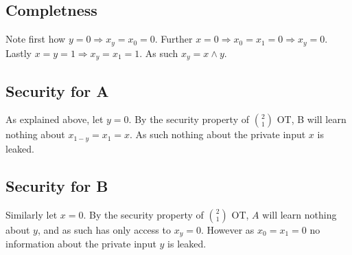 \documentclass[a4paper]{scrreprt}
\begin{document}
\subsection{Completness}

Note first how $y = 0 \Rightarrow x_y = x_0 = 0$. Further $x = 0 \Rightarrow
x_0 = x_1 = 0 \Rightarrow x_y = 0$. Lastly $x = y = 1 \Rightarrow x_y = x_1 =
1$. As such $x_y = x \land y$.

\subsection{Security for A}

As explained above, let $y = 0$. By the security property of $\binom{2}{1}$ OT,
B will learn nothing about $x_{1 - y} = x_1 = x$. As such nothing about the
private input $x$ is leaked.

\subsection{Security for B}

Similarly let $x = 0$. By the security property of $\binom{2}{1}$ OT, $A$ will
learn nothing about $y$, and as such has only access to $x_y = 0$.  However as
$x_0 = x_1 = 0$ no information about the private input $y$ is leaked.
\end{document}
